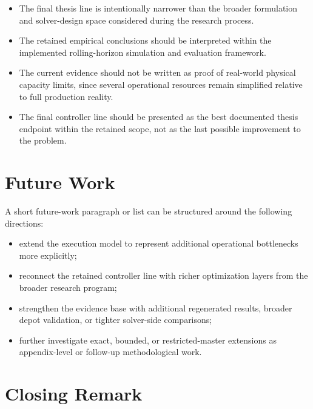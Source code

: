 \begin{itemize}
    \item The final thesis line is intentionally narrower than the broader formulation and solver-design space considered during the research process.
    \item The retained empirical conclusions should be interpreted within the implemented rolling-horizon simulation and evaluation framework.
    \item The current evidence should not be written as proof of real-world physical capacity limits, since several operational resources remain simplified relative to full production reality.
    \item The final controller line should be presented as the best documented thesis endpoint within the retained scope, not as the last possible improvement to the problem.
\end{itemize}

\section{Future Work}


A short future-work paragraph or list can be structured around the following directions:

\begin{itemize}
    \item extend the execution model to represent additional operational bottlenecks more explicitly;
    \item reconnect the retained controller line with richer optimization layers from the broader research program;
    \item strengthen the evidence base with additional regenerated results, broader depot validation, or tighter solver-side comparisons;
    \item further investigate exact, bounded, or restricted-master extensions as appendix-level or follow-up methodological work.
\end{itemize}


\section{Closing Remark}


